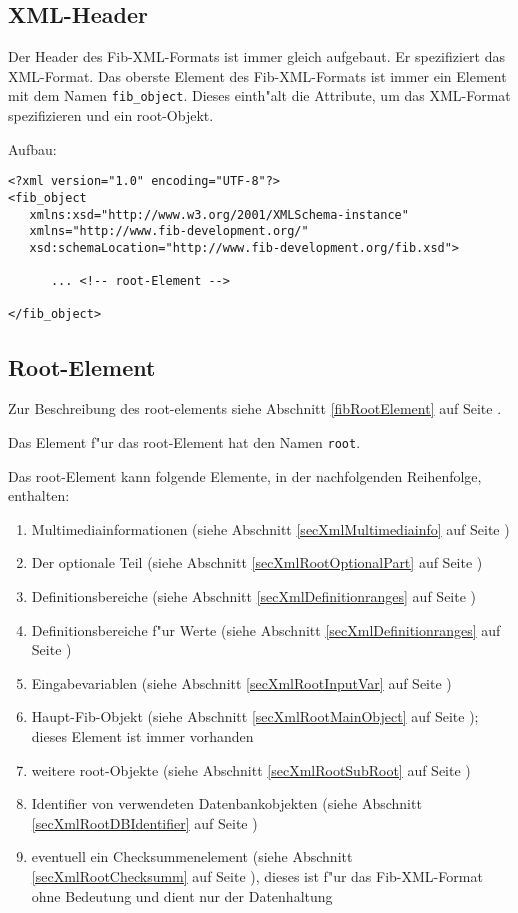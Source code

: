\subsection{XML-Header}

Der Header des Fib-XML-Formats ist immer gleich aufgebaut. Er spezifiziert das XML-Format. Das oberste Element des Fib-XML-Formats ist immer ein Element mit dem Namen \verb|fib_object|. Dieses einth"alt die Attribute, um das XML-Format spezifizieren und ein root-Objekt.

\bigskip\noindent
Aufbau:
\begin{verbatim}
<?xml version="1.0" encoding="UTF-8"?>
<fib_object
   xmlns:xsd="http://www.w3.org/2001/XMLSchema-instance"
   xmlns="http://www.fib-development.org/"
   xsd:schemaLocation="http://www.fib-development.org/fib.xsd">

      ... <!-- root-Element -->

</fib_object>
\end{verbatim}


\subsection{Root-Element}
\label{secXmlRootElement}

Zur Beschreibung des root-elements siehe Abschnitt \ref{fibRootElement} auf Seite \pageref{fibRootElement} .

Das Element f"ur das root-Element hat den Namen \verb|root|.

Das root-Element kann folgende Elemente, in der nachfolgenden Reihenfolge, enthalten:
\begin{enumerate}
 \item Multimediainformationen (siehe Abschnitt \ref{secXmlMultimediainfo} auf Seite \pageref{secXmlMultimediainfo})
 \item Der optionale Teil (siehe Abschnitt \ref{secXmlRootOptionalPart} auf Seite \pageref{secXmlRootOptionalPart})
 \item Definitionsbereiche (siehe Abschnitt \ref{secXmlDefinitionranges} auf Seite \pageref{secXmlDefinitionranges})
 \item Definitionsbereiche f"ur Werte (siehe Abschnitt \ref{secXmlDefinitionranges} auf Seite \pageref{secXmlDefinitionranges})
 \item Eingabevariablen (siehe Abschnitt \ref{secXmlRootInputVar} auf Seite \pageref{secXmlRootInputVar})
 \item Haupt-Fib-Objekt (siehe Abschnitt \ref{secXmlRootMainObject} auf Seite \pageref{secXmlRootMainObject}); dieses Element ist immer vorhanden
 \item weitere root-Objekte (siehe Abschnitt \ref{secXmlRootSubRoot} auf Seite \pageref{secXmlRootSubRoot})
 \item Identifier von verwendeten Datenbankobjekten (siehe Abschnitt \ref{secXmlRootDBIdentifier} auf Seite \pageref{secXmlRootDBIdentifier})
 \item eventuell ein Checksummenelement (siehe Abschnitt \ref{secXmlRootChecksumm} auf Seite \pageref{secXmlRootChecksumm} ), dieses ist f"ur das Fib-XML-Format ohne Bedeutung und dient nur der Datenhaltung
\end{enumerate}


